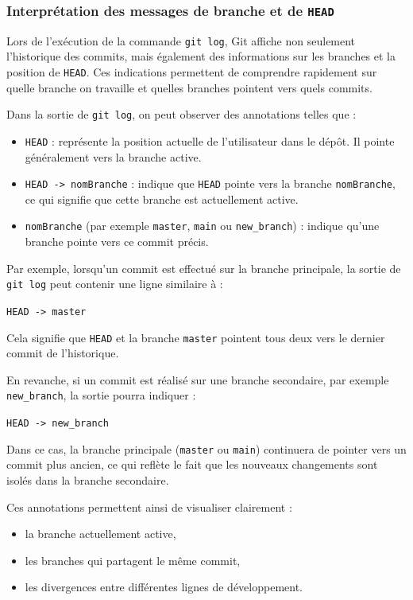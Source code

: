 \documentclass{article}
\begin{document}
\subsubsection{Interprétation des messages de branche et de \texttt{HEAD}}

Lors de l’exécution de la commande \texttt{git log}, Git affiche non seulement l’historique des commits, mais également des informations sur les branches et la position de \texttt{HEAD}. Ces indications permettent de comprendre rapidement sur quelle branche on travaille et quelles branches pointent vers quels commits.

Dans la sortie de \texttt{git log}, on peut observer des annotations telles que :
\begin{itemize}
    \item \texttt{HEAD} : représente la position actuelle de l’utilisateur dans le dépôt. Il pointe généralement vers la branche active.
    \item \texttt{HEAD -> nomBranche} : indique que \texttt{HEAD} pointe vers la branche \texttt{nomBranche}, ce qui signifie que cette branche est actuellement active.
    \item \texttt{nomBranche} (par exemple \texttt{master}, \texttt{main} ou \texttt{new\_branch}) : indique qu’une branche pointe vers ce commit précis.
\end{itemize}

Par exemple, lorsqu’un commit est effectué sur la branche principale, la sortie de \texttt{git log} peut contenir une ligne similaire à :
\begin{center}
\texttt{HEAD -> master}
\end{center}
Cela signifie que \texttt{HEAD} et la branche \texttt{master} pointent tous deux vers le dernier commit de l’historique.

En revanche, si un commit est réalisé sur une branche secondaire, par exemple \texttt{new\_branch}, la sortie pourra indiquer :
\begin{center}
\texttt{HEAD -> new\_branch}
\end{center}
Dans ce cas, la branche principale (\texttt{master} ou \texttt{main}) continuera de pointer vers un commit plus ancien, ce qui reflète le fait que les nouveaux changements sont isolés dans la branche secondaire.

Ces annotations permettent ainsi de visualiser clairement :
\begin{itemize}
    \item la branche actuellement active,
    \item les branches qui partagent le même commit,
    \item les divergences entre différentes lignes de développement.
\end{itemize}
\end{document}
